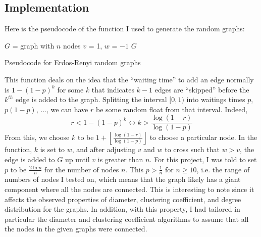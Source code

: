 \documentclass{article}
\begin{document}
\subsection{Implementation}
    Here is the pseudocode of the function I used to generate the random graphs:
    \begin{algorithm}
        \BlankLine
        $G$ = graph with $n$ nodes\;
        $v$ = 1, $w$ = $-1$\;
        \While{$v < n$}{
            $r$ = random float from $[0.0, 1)$\;
            $w$ = $w+1+\left\lfloor\frac{\log{1-r}}{\log{1-p}}\right\rfloor$\;
            \While{$w \le v$ and $v < n$}{
                $w = w - v$++\;
            }
            \If{$v < n$}{
                add edge $(v, w)$ to $G$\;
            }
        }
        \Return $G$\;
        \caption{Pseudocode for Erdos-Renyi random graphs}
    \end{algorithm}
    \noindent This function deals on the idea that the ``waiting time'' to add
    an edge normally is $1 - (1 - p)^k$ for some $k$ that indicates $k - 1$
    edges are ``skipped'' before the $k^{th}$ edge is added to the graph. 
    Splitting the interval $[0,1)$ into waitings times $p$, $p(1 - p)$, ..., 
    we can have $r$ be some random float from that interval. Indeed, 
    \begin{equation*}
        r < 1 - (1 - p)^k \longleftrightarrow k > \frac{\log{(1 - r)}}{\log{(1 - p)}}
    \end{equation*}
    \noindent From this, we choose $k$ to be 
    $1 + \left\lfloor\frac{\log{(1 - r)}}{\log{(1 - p)}}\right\rfloor$ to choose
    a particular node. In the function, $k$ is set to $w$, and after adjusting
    $v$ and $w$ to cross such that $w > v$, the edge is added to $G$ up until
    $v$ is greater than $n$.
    \nextblurb
    For this project, I was told to set $p$ to be $\frac{2\ln{n}}{n}$ for the
    number of nodes $n$. This $p > \frac{1}{n}$ for $n \ge 10$, i.e. the range
    of numbers of nodes I tested on, which means that the graph likely has a  
    giant component where all the nodes are connected. This is interesting to 
    note since it affects the observed properties of diameter, clustering
    coefficient, and degree distribution for the graphs. In addition, with
    this property, I had tailored in particular the diameter and clustering
    coefficient algorithms to assume that all the nodes in the given graphs 
    were connected.
\end{document}
